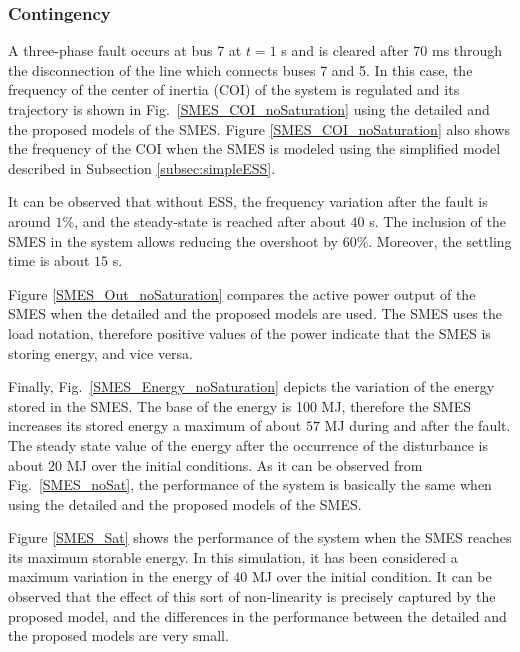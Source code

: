 \documentclass[journal, a4paper]{IEEEtran}
\begin{document}
\subsubsection{Contingency}
\label{subsub:smesdeterm}
A three-phase fault occurs at bus 7 at $t = 1$ s and is cleared after
$70$ ms through the disconnection of the line which connects buses 7
and 5.  In this case, the frequency of the center of inertia (COI) of
the system is regulated and its trajectory is shown in
Fig.~\ref{SMES_COI_noSaturation} using the detailed and the proposed
models of the SMES.  Figure \ref{SMES_COI_noSaturation} also shows the
frequency of the COI when the SMES is modeled using the simplified
model described in Subsection \ref{subsec:simpleESS}.

It can be observed that without ESS, the frequency variation after the
fault is around $1\%$, and the steady-state is reached after about
$40$ s.  The inclusion of the SMES in the system allows reducing the
overshoot by $60\%$.  Moreover, the settling time is about $15$ s.

Figure \ref{SMES_Out_noSaturation} compares the active power output of
the SMES when the detailed and the proposed models are used.  The SMES
uses the load notation, therefore positive values of the power
indicate that the SMES is storing energy, and vice versa.

Finally, Fig.~\ref{SMES_Energy_noSaturation} depicts the
  variation of the energy stored in the SMES. The base of the energy
  is 100 MJ, therefore the SMES increases its stored energy a maximum
  of about $57$ MJ during and after the fault.  The steady state value
  of the energy after the occurrence of the disturbance is about $20$
  MJ over the initial conditions.
As it can be observed from Fig.~\ref{SMES_noSat}, the performance of
the system is basically the same when using the detailed and the
proposed models of the SMES.

Figure \ref{SMES_Sat} shows the performance of the system when the
SMES reaches its maximum storable energy. In this simulation, it
  has been considered a maximum variation in the energy of $40$ MJ
  over the initial condition. It can be observed that the effect of
this sort of non-linearity is precisely captured by the proposed
model, and the differences in the performance between the detailed and
the proposed models are very small.
\end{document}

